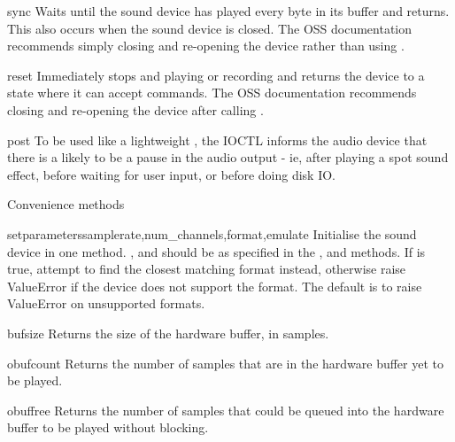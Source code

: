\begin{methoddesc}{sync}
Waits until the sound device has played every byte in its buffer and returns.
This also occurs when the sound device is closed. The OSS documentation
recommends simply closing and re-opening the device rather than using
.
\end{methoddesc}

\begin{methoddesc}{reset}
Immediately stops and playing or recording and returns the device to a state
where it can accept commands. The OSS documentation recommends closing and
re-opening the device after calling .
\end{methoddesc}

\begin{methoddesc}{post}
To be used like a lightweight , the  IOCTL informs the
audio device that there is a likely to be a pause in the audio output - ie,
after playing a spot sound effect, before waiting for user input, or before
doing disk IO.
\end{methoddesc}

Convenience methods

\begin{methoddesc}{setparameters}{samplerate,num_channels,format,emulate}
Initialise the sound device in one method. ,  and
 should be as specified in the ,  and
 methods. If  is true, attempt to find the closest
matching format instead, otherwise raise ValueError if the
device does not support the format. The default is to raise ValueError on
unsupported formats.
\end{methoddesc}

\begin{methoddesc}{bufsize}{}
Returns the size of the hardware buffer, in samples.
\end{methoddesc}

\begin{methoddesc}{obufcount}{}
Returns the number of samples that are in the hardware buffer yet to be played.
\end{methoddesc}

\begin{methoddesc}{obuffree}{}
Returns the number of samples that could be queued into the hardware buffer to
be played without blocking.
\end{methoddesc}

